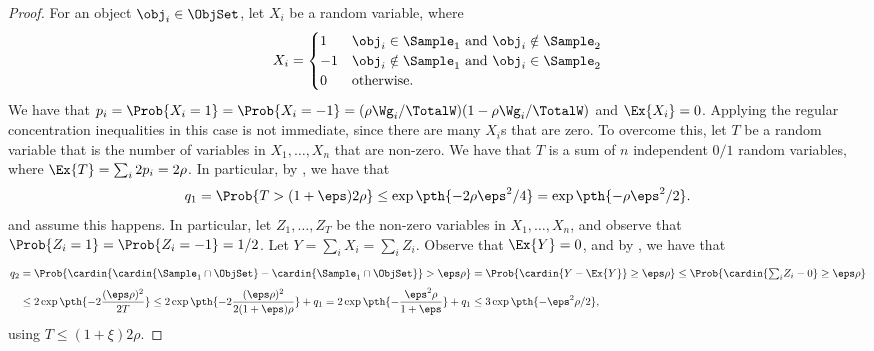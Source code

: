 \begin{proof}
    For an object $\obj_i \in \ObjSet$, let $X_i$ be a random 
    variable, where
    \begin{equation*}
        X_i = \begin{cases}
            1 & \obj_i \in \Sample_1 \text{ and } \obj_i \notin
            \Sample_2\\
            -1 & \obj_i \notin \Sample_1 \text{ and } \obj_i \in
            \Sample_2\\
            0 & \text{otherwise.}
        \end{cases}
    \end{equation*}
    We have that
    $p_i = \Prob{X_i = 1} = \Prob{X_i=-1} = (\rho \Wg_i / \TotalW)( 1-
    \rho \Wg_i / \TotalW)$ and $\Ex{X_i} = 0$. Applying the regular
    concentration inequalities in this case is not immediate, since
    there are many $X_i$s that are zero. To overcome this, let $T$ be
    a random variable that is the number of variables in
    $X_1, \ldots, X_n$ that are non-zero. We have that $T$ is a sum of
    $n$ independent $0/1$ random variables, where
    $\Ex{T} = \sum_i 2p_i =2 \rho$. In particular, by
    , we have
    that
    \begin{equation*}
        q_1 = \Prob{\bigl. T  > (1+\eps) 2 \rho}%
        \leq%
        \exp\pth{ \bigl.- 2\rho\eps^2 /4}
        =%
        \exp\pth{ \bigl.- \rho\eps^2 /2}.
    \end{equation*}
    and assume this happens.  In particular, let $Z_1, \ldots, Z_T$ be
    the non-zero variables in $X_1,\ldots, X_n$, and observe that
    $\Prob{Z_i=1} = \Prob{Z_i=-1} = 1/2$.  Let
    $Y=\sum_i X_i = \sum_i Z_i$. Observe that $\Ex{Y} = 0$, and by
    , we have that
    \begin{align*}
      q_2%
      &=%
        \Prob{\Bigl.
        \cardin{\bigl.\cardin{\Sample_1 \cap \ObjSet} - \cardin{\Sample_1
        \cap \ObjSet} }%
        > %
        \eps \rho
        }
        =%
        \Prob{\Bigl. \cardin{Y - \Ex{Y}} \geq \eps \rho}
        \leq%
        \Prob{\Bigl. \cardin{\bigl.\textstyle{\sum}_i Z_i - 0} \geq
        \eps \rho}
      \\%
      &
        \leq%
        2 \exp\pth{ - 2 \frac{ (\eps \rho)^2 }{2T}}
        \leq%
        2 \exp\pth{ - 2 \frac{ (\eps \rho)^2 }{2(1+\eps)\rho}} + q_1
        =%
        2 \exp\pth{ -  \frac{ \eps^2 \rho }{1+\eps}} + q_1
        \leq%
        3 \exp\pth{ -   \eps^2 \rho/2 },
    \end{align*}
    using $T \leq (1+\xi)2\rho$.
\end{proof}



